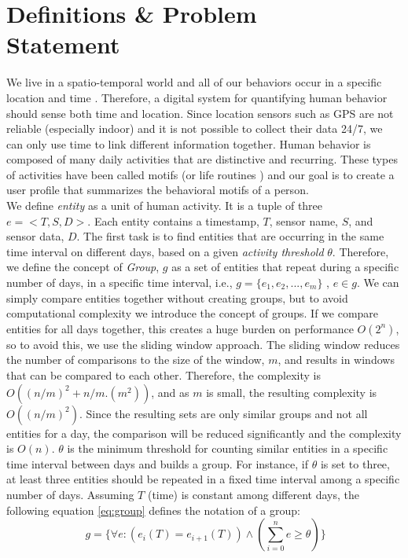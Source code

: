 \documentclass{sig-alternate}
\begin{document}
\section{Definitions \& Problem \\ Statement}
We live in a spatio-temporal world and all of our behaviors occur in a specific location and time \cite{towsharing}. Therefore, a digital system for quantifying human behavior should sense both time and location. Since location sensors such as GPS are not reliable (especially indoor) and it is not possible to collect their data 24/7, we can only use time to link different information together. Human behavior is composed of many daily activities that are distinctive and recurring. These types of activities have been called motifs (or life routines \cite{realitymining}) and our goal is to create a user profile that summarizes the behavioral motifs of a person. \\
We define \emph{entity} as a unit of human activity. It is a tuple of three $e = <T,S,D>$. Each entity contains a timestamp, $T$, sensor name, $S$, and sensor data, $D$. The first task is to find entities that are occurring in the same time interval on different days, based on a given \emph{activity threshold} $\theta$. Therefore, we define the concept of \emph{Group}, $g$ as a set of entities that repeat during a specific number of days, in a specific time interval, i.e., $g=\{e_1,e_2,..., e_m\}$ , $e \in  g$. We can simply compare entities together without creating groups, but to avoid computational complexity we introduce the concept of groups. If we compare entities for all days together, this creates a huge burden on performance $O({2}^{n})$, so to avoid this, we use the sliding window approach. The sliding window reduces the number of comparisons to the size of the window, $m$, and results in windows that can be compared to each other. Therefore, the complexity is $O((n/m)^2 + n/m.(m^2))$, and as $m$ is small, the resulting complexity is $O((n/m)^{2})$. Since the resulting sets are only similar groups and not all entities for a day, the comparison will be reduced significantly and the complexity is $O(n)$. $\theta$ is the minimum threshold for counting similar entities in a specific time interval between days and builds a group. For instance, if $\theta$ is set to three, at least three entities should be repeated in a fixed time interval among a specific number of days. Assuming $T$ (time) is constant among different days, the following equation \ref{eq:group} defines the notation of a group:
\begin{equation}\label{eq:group}
 \ g= \{ \forall e : (e_{i}(T) = e_{i+1}(T) )  \wedge  (\sum _{ i=0 }^{ n }{ e } \geq \theta )\}
\end{equation}
\end{document}
